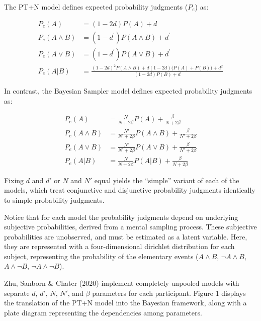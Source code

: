 \documentclass[
  english,
  man,floatsintext]{apa6}
\begin{document}
The PT+N model defines expected probability judgments (\(P_e\)) as:

\begin{align*}
  P_{e}(A) &= (1-2d)P(A) + d \\
  P_e(A\land B) &= (1-d^\prime)P(A \land B)+d^\prime \\
  P_e(A\lor B) &= (1-d^\prime)P(A \lor B)+d^\prime \\
  P_e(A|B) &= \frac{(1-2d)^2P(A \land B) + d(1-2d)\big(P(A)+P(B)\big)+d^2}{(1-2d)P(B)+d}
\end{align*}

In contrast, the Bayesian Sampler model defines expected probability judgments as:

\begin{align*}
  P_{e}(A) &= \frac{N}{N + 2 \beta}P(A) + \frac{\beta}{N+2 \beta} \\
  P_{e}(A \land B) &= \frac{N’}{N’ + 2 \beta}P(A \land B) + \frac{\beta}{N’+2 \beta} \\
  P_{e}(A \lor B) &= \frac{N’}{N’ + 2 \beta}P(A \lor B) + \frac{\beta}{N’+2 \beta} \\
  P_{e}(A|B) &= \frac{N}{N + 2 \beta}P(A|B) + \frac{\beta}{N+2 \beta}
\end{align*}

Fixing \(d\) and \(d'\) or \(N\) and \(N'\) equal yields the ``simple'' variant of each of the models, which treat conjunctive and disjunctive probability judgments identically to simple probability judgments.

Notice that for each model the probability judgments depend on underlying subjective probabilities, derived from a mental sampling process. These subjective probabilities are unobserved, and must be estimated as a latent variable. Here, they are represented with a four-dimensional dirichlet distribution for each subject, representing the probability of the elementary events (\(A \land B\), \(\neg A \land B\), \(A \land \neg B\), \(\neg A \land \neg B\)).

Zhu, Sanborn \& Chater (2020) implement completely unpooled models with separate \(d\), \(d'\), \(N\), \(N'\), and \(\beta\) parameters for each participant. Figure 1 displays the translation of the PT+N model into the Bayesian framework, along with a plate diagram representing the dependencies among parameters.
\end{document}
